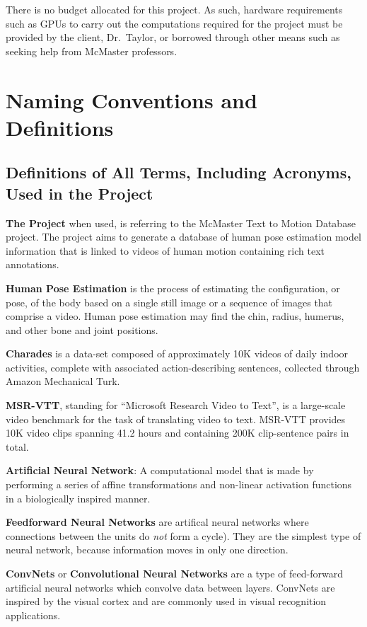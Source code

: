 \documentclass{scrreprt}
\begin{document}
There is no budget allocated for this project. As such, hardware requirements
such as GPUs to carry out the computations required for the project must be
provided by the client, Dr.\ Taylor, or borrowed through other means such as
seeking help from McMaster professors.

\section{Naming Conventions and Definitions}

\subsection{Definitions of All Terms, Including Acronyms, Used in the Project}

\textbf{The Project} when used, is referring to the McMaster Text to Motion
Database project. The project aims to generate a database of human pose
estimation model information that is linked to videos of human motion
containing rich text annotations.

\textbf{Human Pose Estimation} is the process of estimating the configuration,
or pose, of the body based on a single still image or a sequence of images that
comprise a video. Human pose estimation may find the chin, radius, humerus, and
other bone and joint positions.

\textbf{Charades} is a data-set composed of approximately 10K videos of daily
indoor activities, complete with associated action-describing sentences,
collected through Amazon Mechanical Turk\cite{charades}.

\textbf{MSR-VTT}, standing for ``Microsoft Research Video to Text'', is a
large-scale video benchmark for the task of translating video to text. MSR-VTT
provides 10K video clips spanning 41.2 hours and containing 200K clip-sentence
pairs in total\cite{msr-vtt}.

\textbf{Artificial Neural Network}: A computational model that is made by performing a series of affine transformations
and non-linear activation functions in a biologically inspired manner.

\textbf{Feedforward Neural Networks} are artifical neural networks where
connections between the units do \textit{not} form a cycle). They are the
simplest type of neural network, because information moves in only one
direction.

\textbf{ConvNets} or \textbf{Convolutional Neural Networks} are a type of
feed-forward artificial neural networks which convolve data between layers. ConvNets are inspired by the visual
cortex and are commonly used in visual recognition applications.
\end{document}
